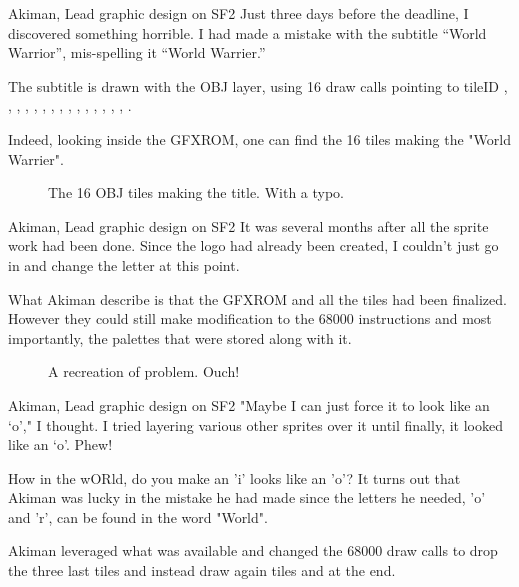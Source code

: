 \begin{q}{Akiman, Lead graphic design on SF2}
Just three days before the deadline, I discovered something horrible. I had made a mistake with the subtitle “World Warrior”, mis-spelling it “World Warrier.”
\end{q}

The subtitle is drawn with the OBJ layer, using 16 draw calls pointing to tileID , , , , , , , , , , , , , , , . 

Indeed, looking inside the GFXROM, one can find the 16 tiles making the "World Warrier". 

\begin{figure}[H]
 \caption*{The 16 OBJ tiles making the title. With a typo.}%
 \end{figure}%

\begin{q}{Akiman, Lead graphic design on SF2}
It was several months after all the sprite work had been done. Since the logo had already been created, I couldn’t just go in and change the letter at this point.
\end{q}

What Akiman describe is that the GFXROM and all the tiles had been finalized. However they could still make modification to the 68000 instructions and most importantly, the palettes that were stored along with it.

\begin{figure}[H]
 \caption*{A recreation of problem. Ouch!}%
 \end{figure}%

\begin{q}{Akiman, Lead graphic design on SF2}
"Maybe I can just force it to look like an ‘o’," I thought. I tried layering various other sprites over it until finally, it looked like an ‘o’. Phew!
\end{q}

How in the wORld, do you make an 'i' looks like an 'o'? It turns out that Akiman was lucky in the mistake he had made since the letters he needed, 'o' and 'r', can be found in the word "World".

Akiman leveraged what was available and changed the 68000 draw calls to drop the three last tiles and instead draw again tiles  and  at the end.

